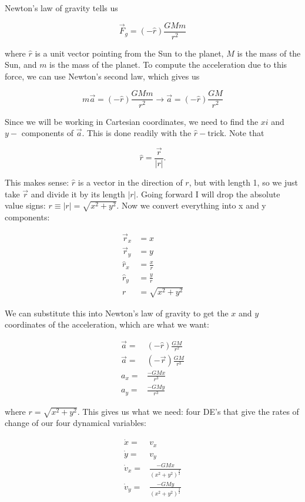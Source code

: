 \documentclass[12ampt]{article}
\begin{document}
Newton's law of gravity tells us

\begin{equation}
  \vec F_g = (-\hat r) \frac{GMm}{r^2}
\end{equation}

where $\hat r$ is a unit vector pointing from the Sun to the planet, $M$ is the mass of the Sun, and $m$ is the mass of the planet. To compute the acceleration due to this force, we can use Newton's second law, which gives us

\begin{equation}
  m \vec a = (-\hat r) \frac{GMm}{r^2} \rightarrow \vec a = (-\hat r) \frac{GM}{r^2}
\end{equation}

Since we will be working in Cartesian coordinates, we need to find the $xi$ and $y-$ components of $\vec a$. This is done readily with the $\hat r-$trick. Note that

\begin{equation}
  \hat r = \frac{\vec r}{|r|}.
\end{equation}

This makes sense: $\hat r$ is a vector in the direction of $r$, but with length 1, so we just take $\vec r$ and divide it by its length $|r|$. Going forward I will drop the absolute value signs: $r \equiv |r| = \sqrt{x^2+y^2}$.
Now we convert everything into x and y components:

\begin{align}
  \vec r_x &= x \\
  \vec r_y &= y \\
  \hat r_x &= \frac{x}{r} \\
  \hat r_y &= \frac{y}{r} \\
  r &= \sqrt{x^2+y^2}
\end{align}

We can substitute this into Newton's law of gravity to get the $x$ and $y$ coordinates of the acceleration, which are what we want:

\begin{align}
  \vec a =& (-\hat r) \frac{GM}{r^2} \\
  \vec a =& (-\vec r) \frac{GM}{r^3} \\
  a_x =& \frac{-GMx}{r^3} \\
  a_y =& \frac{-GMy}{r^3}
\end{align}

  where $r=\sqrt{x^2+y^2}$. This gives us what we need: four DE's that give the rates of change of our four dynamical variables:

  \begin{align}
      \dot x =& v_x \\
      \dot y =& v_y \\
    \dot v_x =& \frac{-GMx}{(x^2+y^2)^{\frac{3}{2}}}\\
    \dot v_y =& \frac{-GMy}{(x^2+y^2)^{\frac{3}{2}}}\\
  \end{align}

  
\end{document}
